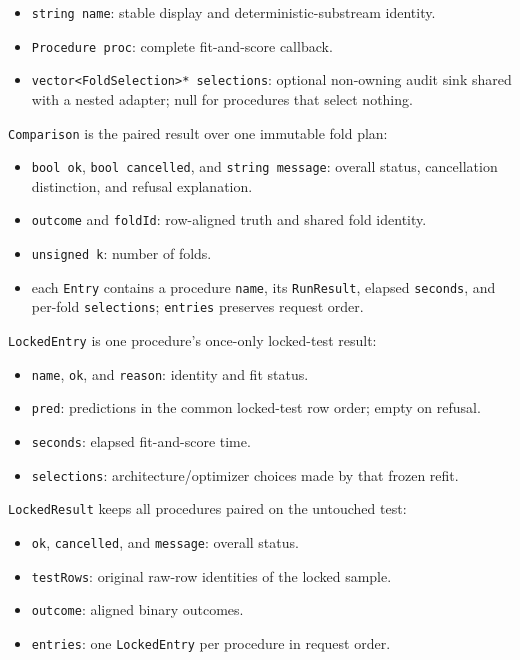 \begin{itemize}
\item \texttt{string name}: stable display and deterministic-substream identity.
\item \texttt{Procedure proc}: complete fit-and-score callback.
\item \texttt{vector<FoldSelection>* selections}: optional non-owning audit
      sink shared with a nested adapter; null for procedures that select nothing.
\end{itemize}

\texttt{Comparison} is the paired result over one immutable fold plan:

\begin{itemize}
\item \texttt{bool ok}, \texttt{bool cancelled}, and \texttt{string message}:
      overall status, cancellation distinction, and refusal explanation.
\item \texttt{outcome} and \texttt{foldId}: row-aligned truth and shared fold identity.
\item \texttt{unsigned k}: number of folds.
\item each \texttt{Entry} contains a procedure \texttt{name}, its
      \texttt{RunResult}, elapsed \texttt{seconds}, and per-fold
      \texttt{selections}; \texttt{entries} preserves request order.
\end{itemize}

\texttt{LockedEntry} is one procedure's once-only locked-test result:

\begin{itemize}
\item \texttt{name}, \texttt{ok}, and \texttt{reason}: identity and fit status.
\item \texttt{pred}: predictions in the common locked-test row order; empty on refusal.
\item \texttt{seconds}: elapsed fit-and-score time.
\item \texttt{selections}: architecture/optimizer choices made by that frozen refit.
\end{itemize}

\texttt{LockedResult} keeps all procedures paired on the untouched test:

\begin{itemize}
\item \texttt{ok}, \texttt{cancelled}, and \texttt{message}: overall status.
\item \texttt{testRows}: original raw-row identities of the locked sample.
\item \texttt{outcome}: aligned binary outcomes.
\item \texttt{entries}: one \texttt{LockedEntry} per procedure in request order.
\end{itemize}

